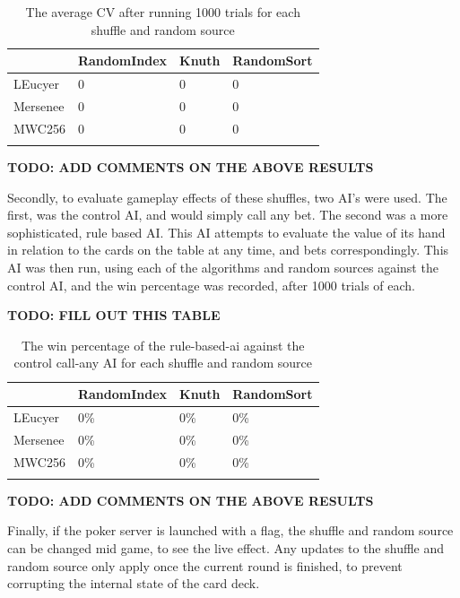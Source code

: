 \begin{table}[H]
    \centering
    \begin{tabular}{l l l l}
    \toprule
                & RandomIndex   & Knuth & RandomSort  \\
    \midrule
    LEucyer     & 0             & 0     & 0           \\ \addlinespace
    Mersenee    & 0             & 0     & 0           \\ \addlinespace
    MWC256      & 0             & 0     & 0           \\ \addlinespace
    \bottomrule
    \end{tabular}
    \caption{The average CV after running 1000 trials for each shuffle and
             random source}
\end{table}

\textbf{TODO: ADD COMMENTS ON THE ABOVE RESULTS}

Secondly, to evaluate gameplay effects of these shuffles, two AI's were used.
The first, was the control AI, and would simply call any bet. The second
was a more sophisticated, rule based AI\@. This AI attempts to evaluate the value
of its hand in relation to the cards on the table at any time, and bets
correspondingly. This AI was then run, using each of the algorithms and
random sources against the control AI, and the win percentage was recorded,
after 1000 trials of each.

\textbf{TODO: FILL OUT THIS TABLE}

\begin{table}[H]
    \centering
    \begin{tabular}{l l l l}
    \toprule
                & RandomIndex   & Knuth & RandomSort  \\
    \midrule
    LEucyer     & 0\%           & 0\%   & 0\%         \\ \addlinespace
    Mersenee    & 0\%           & 0\%   & 0\%         \\ \addlinespace
    MWC256      & 0\%           & 0\%   & 0\%         \\ \addlinespace
    \bottomrule
    \end{tabular}
    \caption{The win percentage of the rule-based-ai against the control
             call-any AI for each shuffle and random source}
\end{table}

\textbf{TODO: ADD COMMENTS ON THE ABOVE RESULTS}

Finally, if the poker server is launched with a flag, the shuffle and random
source can be changed mid game, to see the live effect. Any updates to the
shuffle and random source only apply once the current round is finished, to
prevent corrupting the internal state of the card deck.


